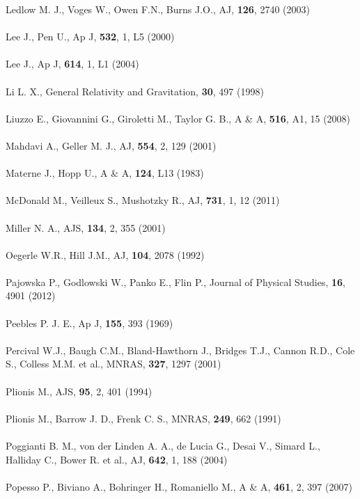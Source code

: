 Ledlow M. J., Voges W., Owen F.N., Burns J.O., AJ, \textbf{126}, 2740 (2003)\\\\
Lee J., Pen U., Ap J, \textbf{532}, 1, L5 (2000)\\\\
Lee J., Ap J, \textbf{614}, 1, L1 (2004)\\\\
Li L. X., General Relativity and Gravitation, \textbf{30}, 497 (1998)\\\\
Liuzzo E., Giovannini G., Giroletti M., Taylor G. B., A \& A, \textbf{ 516}, A1, 15 (2008)\\\\
Mahdavi A., Geller M. J., AJ, \textbf{ 554},  2, 129 (2001)\\\\
Materne J., Hopp U., A \& A, \textbf{124}, L13 (1983)\\\\
McDonald M., Veilleux S., Mushotzky R., AJ, \textbf{ 731},  1, 12 (2011)\\\\
Miller N. A., AJS, \textbf{ 134},  2, 355 (2001)\\\\
Oegerle W.R., Hill J.M., AJ, \textbf{104}, 2078 (1992)\\\\
Pajowska P., Godlowski W., Panko E., Flin P., Journal of Physical Studies, \textbf{16}, 4901 (2012)\\\\
Peebles P. J. E., Ap J, \textbf{155}, 393 (1969)\\\\
Percival W.J., Baugh C.M., Bland-Hawthorn J., Bridges T.J., Cannon R.D., Cole S., Colless M.M. et al., MNRAS, \textbf{327}, 1297 (2001)\\\\
Plionis M., AJS, \textbf{ 95},  2, 401 (1994)\\\\
Plionis M., Barrow J. D., Frenk C. S., MNRAS, \textbf{ 249}, 662 (1991)\\\\
Poggianti B. M., von der Linden A. A., de Lucia G., Desai V., Simard L., Halliday C., Bower R. et al., AJ, \textbf{ 642},  1, 188 (2004)\\\\
Popesso P., Biviano A., Bohringer H., Romaniello M., A \& A, \textbf{ 461},  2, 397 (2007)\\\\ 
